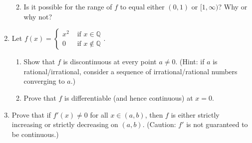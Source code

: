 \documentclass[12pt]{article}
\newcommand{\points}[1]{\marginpar{\hspace{24pt}[#1]}}
\newcommand{\Q}{\mathbb{Q}}
\begin{document}
\begin{enumerate}
\begin{enumerate}
\vspace{1.5in}

 \item Is it possible for the range of $f$ to equal either $(0,1)$ or $[1,\infty)$? Why or why not? \points{2}
\end{enumerate}
\newpage

\item Let $f(x)=\begin{cases} x^2 & \text{ if } x\in\Q\\ 0 & \text{ if } x\notin\Q\end{cases}$.
\begin{enumerate}
 \item Show that $f$ is discontinuous at every point $a\neq 0$.\points{4} (Hint: if $a$ is rational/irrational, consider a sequence of irrational/rational numbers converging to $a$.)

\vspace{2in}

 \item Prove that $f$ is differentiable (and hence continuous) at $x=0$. \points{4}

\vspace{2.5in}

\end{enumerate}
\item Prove that if $f'(x)\neq 0$ for all $x\in (a,b)$, then $f$ is either strictly increasing or strictly decreasing on $(a,b)$. \points{4} (Caution: $f'$ is not guaranteed to be continuous.)
\end{enumerate}
\end{document}
